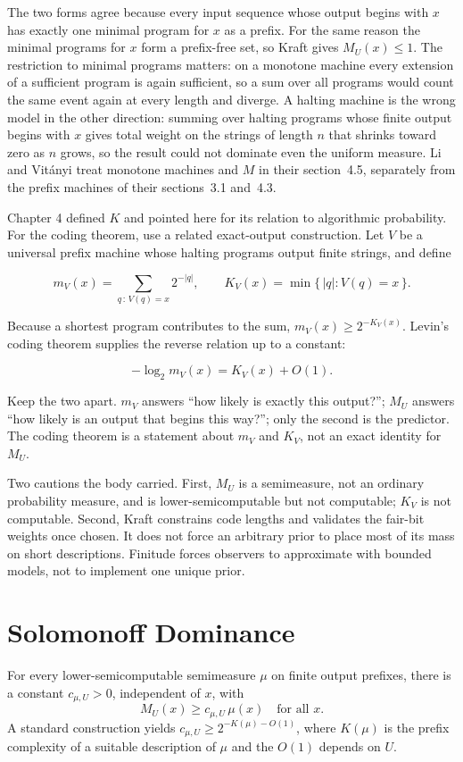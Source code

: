 The two forms agree because every input sequence whose output begins with $x$ has exactly one minimal program for $x$ as a prefix. For the same reason the minimal programs for $x$ form a prefix-free set, so Kraft gives $M_U(x) \le 1$. The restriction to minimal programs matters: on a monotone machine every extension of a sufficient program is again sufficient, so a sum over all programs would count the same event again at every length and diverge. A halting machine is the wrong model in the other direction: summing over halting programs whose finite output begins with $x$ gives total weight on the strings of length $n$ that shrinks toward zero as $n$ grows, so the result could not dominate even the uniform measure. Li and Vit\'anyi treat monotone machines and $M$ in their section~4.5, separately from the prefix machines of their sections~3.1 and~4.3.

Chapter 4 defined $K$ and pointed here for its relation to algorithmic probability. For the coding theorem, use a related exact-output construction. Let $V$ be a universal prefix machine whose halting programs output finite strings, and define

$$m_V(x)=\sum_{q\, :\, V(q)=x}2^{-|q|},
\qquad K_V(x)=\min\{\,|q|:V(q)=x\,\}.$$

Because a shortest program contributes to the sum, $m_V(x)\ge 2^{-K_V(x)}$. Levin's coding theorem supplies the reverse relation up to a constant:

$$-\log_2 m_V(x)=K_V(x)+O(1).$$

Keep the two apart. $m_V$ answers ``how likely is exactly this output?''; $M_U$ answers ``how likely is an output that begins this way?''; only the second is the predictor. The coding theorem is a statement about $m_V$ and $K_V$, not an exact identity for $M_U$.

Two cautions the body carried. First, $M_U$ is a semimeasure, not an ordinary probability measure, and is lower-semicomputable but not computable; $K_V$ is not computable. Second, Kraft constrains code lengths and validates the fair-bit weights once chosen. It does not force an arbitrary prior to place most of its mass on short descriptions. Finitude forces observers to approximate with bounded models, not to implement one unique prior.

\section*{Solomonoff Dominance}

\begin{theorem}[Dominance]
For every lower-semicomputable semimeasure $\mu$ on finite output prefixes, there is a constant $c_{\mu,U} > 0$, independent of $x$, with
$$M_U(x) \ge c_{\mu,U}\, \mu(x) \quad \text{for all } x.$$
A standard construction yields $c_{\mu,U}\ge 2^{-K(\mu)-O(1)}$, where $K(\mu)$ is the prefix complexity of a suitable description of $\mu$ and the $O(1)$ depends on $U$.
\end{theorem}


